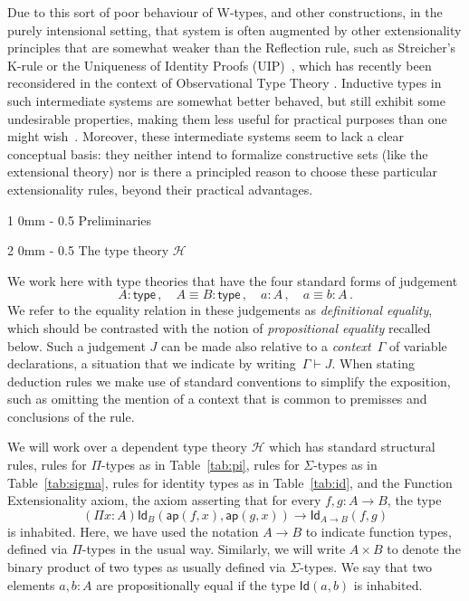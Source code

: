 \documentclass[reqno,10pt,a4paper,oneside]{amsart}
\makeatletter
\numberwithin{equation}{section}
\renewcommand{\section}{\@startsection
  {section}%
   {1}%
  {0mm}%
   {-\baselineskip}%
  {0.5\baselineskip}%
   {\Large\bfseries}}%
\renewcommand{\subsection}{\@startsection
  {subsection}%
  {2}%
  {0mm}%
  {-\baselineskip}%
  {0.5\baselineskip}%
  {\normalfont\normalsize\bf}}%
\theoremstyle{mythm}
\theoremstyle{mydef}
\theoremstyle{myrmk}
\newcommand{\ie}{\text{i.e.\ }}
\newcommand{\deq}{\equiv}
\newcommand{\co}{\colon}
\newcommand{\Hint}{\mathcal{H}}
\newcommand{\type}{\mathsf{type}}
\newcommand{\app}{\mathsf{ap}}
\newcommand{\Id}{\mathsf{Id}}
\newcommand{\id}[1]{\Id_{#1}}
\makeatother
\begin{document}
Due to this sort of poor behaviour of W-types, and other constructions, in the purely intensional setting, that system is often augmented by other extensionality principles that are somewhat weaker than the Reflection rule, such as Streicher's K-rule  or the Uniqueness of Identity Proofs (UIP)~\cite{StreicherT:invitt}, which has recently been reconsidered
in the context of Observational Type Theory \cite{AltenkirchT:obsen}.  Inductive types in such intermediate systems are somewhat better behaved, but still exhibit some undesirable properties, making them less useful for practical purposes than one might wish~\cite{McBrideC:wtygnb}.  Moreover, these intermediate systems seem to lack a clear conceptual basis:  they neither intend to formalize constructive sets (like the extensional theory) nor is there a principled reason to choose these particular extensionality rules, beyond their practical advantages.  

\newpage

\section{Preliminaries}
\label{section:prelim}

\subsection{The type theory $\Hint$} 

We work here with type theories that have the four standard forms of judgement
\[
A \co \type \, , \quad A \deq B \co \type \, , \quad   a \co A \, , \quad a \deq b \co A \, . 
\]
We refer to the equality relation in these judgements as \emph{definitional equality}, 
which should be contrasted with the notion of \emph{propositional equality}
recalled below. 
Such a judgement $J$ can be made also relative to a \emph{context}~$\Gamma$ of variable declarations, a situation that we indicate by writing~$\Gamma \vdash J$. When stating deduction
rules we make use of standard conventions to simplify the exposition, such as omitting the mention
of a context that is common to premisses and conclusions of the rule.


We will work over a dependent type theory $\Hint$ which has standard structural rules, rules for $\Pi$-types as in Table~\ref{tab:pi}, rules for $\Sigma$-types as in Table~\ref{tab:sigma}, rules for identity types as in Table~\ref{tab:id}, and the Function Extensionality axiom, \ie the axiom asserting that
for every $f, g : A \rightarrow B$, the type
\[
(\Pi x :  A)\id{B}( \app(f, x), \app(g, x)) \rightarrow \id{A \rightarrow B}(f,g) 
\]
is inhabited. Here, we have used the notation $A \rightarrow B$ to indicate function types, defined via
$\Pi$-types in the usual way. Similarly, we will write $A \times B$ to denote the binary product
of two types as usually defined via $\Sigma$-types. We say that two elements  $a, b :A$ are propositionally equal if 
 the type $\Id(a,b)$ is inhabited.
\end{document}
